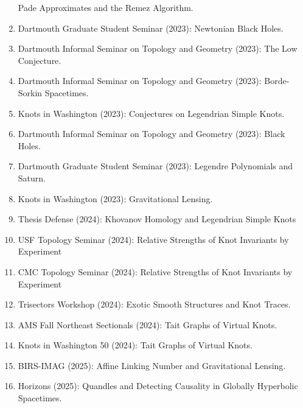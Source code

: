 \documentclass[a4paper,sans]{moderncv}
\begin{document}
\begin{enumerate}
                Pade Approximates and the Remez Algorithm.
            \item
                Dartmouth Graduate Student Seminar (2023):
                Newtonian Black Holes.
            \item
                Dartmouth Informal Seminar on Topology and Geometry (2023):
                The Low Conjecture.
            \item
                Dartmouth Informal Seminar on Topology and Geometry (2023):
                Borde-Sorkin Spacetimes.
            \item
                Knots in Washington (2023):
                Conjectures on Legendrian Simple Knots.
            \item
                Dartmouth Informal Seminar on Topology and Geometry (2023):
                Black Holes.
            \item
                Dartmouth Graduate Student Seminar (2023):
                Legendre Polynomials and Saturn.
            \item
                Knots in Washington (2023):
                Gravitational Lensing.
            \item
                Thesis Defense (2024):
                Khovanov Homology and Legendrian Simple Knots
            \item
                USF Topology Seminar (2024):
                Relative Strengths of Knot Invariants by Experiment
            \item
                CMC Topology Seminar (2024):
                Relative Strengths of Knot Invariants by Experiment
            \item
                Trisectors Workshop (2024):
                Exotic Smooth Structures and Knot Traces.
            \item
                AMS Fall Northeast Sectionals (2024):
                Tait Graphs of Virtual Knots.
            \item
                Knots in Washington 50 (2024):
                Tait Graphs of Virtual Knots.
            \item
                BIRS-IMAG (2025):
                Affine Linking Number and Gravitational Lensing.
            \item
                Horizons (2025):
                Quandles and Detecting Causality
                in Globally Hyperbolic Spacetimes.
        \end{enumerate}
\end{document}
